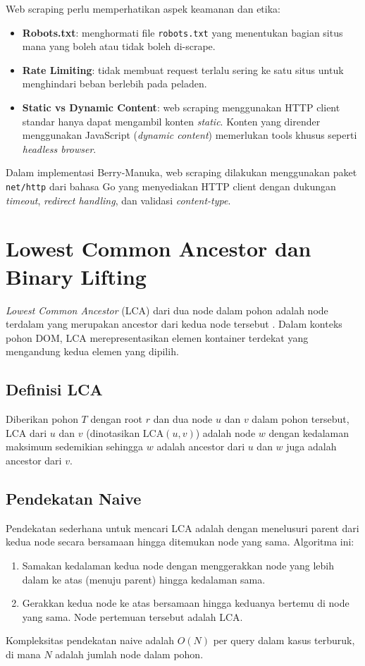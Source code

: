 Web scraping perlu memperhatikan aspek keamanan dan etika:

\begin{itemize}
    \item \textbf{Robots.txt}: menghormati file \texttt{robots.txt} yang menentukan
    bagian situs mana yang boleh atau tidak boleh di-scrape.
    \item \textbf{Rate Limiting}: tidak membuat request terlalu sering ke satu
    situs untuk menghindari beban berlebih pada peladen.
    \item \textbf{Static vs Dynamic Content}: web scraping menggunakan HTTP client
    standar hanya dapat mengambil konten \textit{static}. Konten yang dirender
    menggunakan JavaScript (\textit{dynamic content}) memerlukan tools khusus
    seperti \textit{headless browser}.
\end{itemize}

Dalam implementasi Berry-Manuka, web scraping dilakukan menggunakan paket
\texttt{net/http} dari bahasa Go yang menyediakan HTTP client dengan dukungan
\textit{timeout}, \textit{redirect handling}, dan validasi \textit{content-type}.

\section{Lowest Common Ancestor dan Binary Lifting}

\textit{Lowest Common Ancestor} (LCA) dari dua node dalam pohon adalah node
terdalam yang merupakan ancestor dari kedua node tersebut \cite{cpalgorithms_lca}.
Dalam konteks pohon DOM, LCA merepresentasikan elemen kontainer terdekat yang
mengandung kedua elemen yang dipilih.

\subsection{Definisi LCA}

Diberikan pohon $T$ dengan root $r$ dan dua node $u$ dan $v$ dalam pohon tersebut,
LCA dari $u$ dan $v$ (dinotasikan $\text{LCA}(u, v)$) adalah node $w$ dengan
kedalaman maksimum sedemikian sehingga $w$ adalah ancestor dari $u$ dan $w$
juga adalah ancestor dari $v$.

\subsection{Pendekatan Naive}

Pendekatan sederhana untuk mencari LCA adalah dengan menelusuri parent dari
kedua node secara bersamaan hingga ditemukan node yang sama. Algoritma ini:
\begin{enumerate}
    \item Samakan kedalaman kedua node dengan menggerakkan node yang lebih dalam
    ke atas (menuju parent) hingga kedalaman sama.
    \item Gerakkan kedua node ke atas bersamaan hingga keduanya bertemu di node
    yang sama. Node pertemuan tersebut adalah LCA.
\end{enumerate}
Kompleksitas pendekatan naive adalah $O(N)$ per query dalam kasus terburuk,
di mana $N$ adalah jumlah node dalam pohon.

